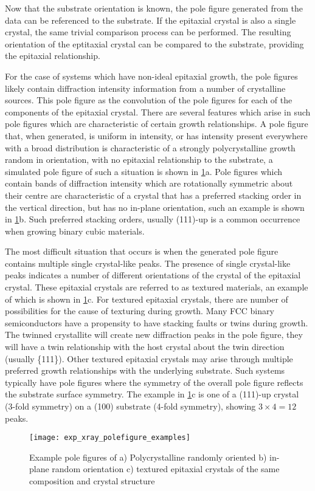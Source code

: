 Now that the substrate orientation is known, the pole figure generated from the data can be referenced to the substrate. If the epitaxial crystal is also a single crystal, the same trivial comparison process can be performed. The resulting orientation of the eptitaxial crystal can be compared to the substrate, providing the epitaxial relationship.

For the case of systems which have non-ideal epitaxial growth, the pole figures likely contain diffraction intensity information from a number of crystalline sources. This pole figure as the convolution of the pole figures for each of the components of the epitaxial crystal. There are several features which arise in such pole figures which are characteristic of certain growth relationships. A pole figure that, when generated, is uniform in intensity, or has intensity present everywhere with a broad distribution is characteristic of a strongly polycrystalline growth random in orientation, with no epitaxial relationship to the substrate, a simulated pole figure of such a situation is shown in \cref{fig:exp_xray_polefigure_examples}a. Pole figures which contain bands of diffraction intensity which are rotationally symmetric about their centre are characteristic of a crystal that has a preferred stacking order in the vertical direction, but has no in-plane orientation, such an example is shown in \cref{fig:exp_xray_polefigure_examples}b. Such preferred stacking orders, usually (111)-up is a common occurrence when growing binary cubic materials.

The most difficult situation that occurs is when the generated pole figure contains multiple single crystal-like peaks. The presence of single crystal-like peaks indicates a number of different orientations of the crystal of the epitaxial crystal. These epitaxial crystals are referred to as textured materials, an example of which is shown in \cref{fig:exp_xray_polefigure_examples}c. For textured epitaxial crystals, there are number of possibilities for the cause of texturing during growth. Many FCC binary semiconductors have a propensity to have stacking faults or twins during growth. The twinned crystallite will create new diffraction peaks in the pole figure, they will have a twin relationship with the host crystal about the twin direction (usually \{111\}). Other textured epitaxial crystals may arise through multiple preferred growth relationships with the underlying substrate. Such systems typically have pole figures where the symmetry of the overall pole figure reflects the substrate surface symmetry. The example in \cref{fig:exp_xray_polefigure_examples}c is one of a (111)-up crystal (3-fold symmetry) on a (100) substrate (4-fold symmetry), showing $3\times 4=12$ peaks.
\begin{figure}
    \centering
    \texttt{[image: exp\_xray\_polefigure\_examples]}
    \caption[Example simulated pole figures]{\label{fig:exp_xray_polefigure_examples}Example pole figures of a) Polycrystalline randomly oriented b) in-plane random orientation c) textured epitaxial crystals of the same composition and crystal structure}
\end{figure}

